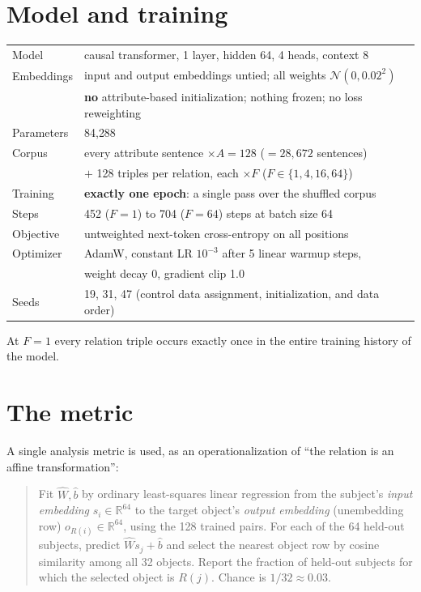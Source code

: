 \documentclass[11pt]{article}
\begin{document}
\section{Model and training}

\begin{center}
\begin{tabular}{ll}
\toprule
Model & causal transformer, 1 layer, hidden 64, 4 heads, context 8\\
Embeddings & input and output embeddings untied; all weights $\mathcal{N}(0, 0.02^2)$\\
 & \textbf{no} attribute-based initialization; nothing frozen; no loss reweighting\\
Parameters & 84{,}288\\
Corpus & every attribute sentence $\times A{=}128$ ($= 28{,}672$ sentences)\\
 & $+$ 128 triples per relation, each $\times F$ ($F \in \{1,4,16,64\}$)\\
Training & \textbf{exactly one epoch}: a single pass over the shuffled corpus\\
Steps & 452 ($F{=}1$) to 704 ($F{=}64$) steps at batch size 64\\
Objective & untweighted next-token cross-entropy on all positions\\
Optimizer & AdamW, constant LR $10^{-3}$ after 5 linear warmup steps,\\
 & weight decay 0, gradient clip 1.0\\
Seeds & 19, 31, 47 (control data assignment, initialization, and data order)\\
\bottomrule
\end{tabular}
\end{center}

At $F{=}1$ every relation triple occurs exactly once in the entire training history of the model.

\section{The metric}

A single analysis metric is used, as an operationalization of ``the relation is an affine transformation'':

\begin{quote}
Fit $\hat W, \hat b$ by ordinary least-squares linear regression from the subject's \emph{input embedding} $s_i \in \mathbb{R}^{64}$ to the target object's \emph{output embedding} (unembedding row) $o_{R(i)} \in \mathbb{R}^{64}$, using the 128 trained pairs. For each of the 64 held-out subjects, predict $\hat W s_j + \hat b$ and select the nearest object row by cosine similarity among all 32 objects. Report the fraction of held-out subjects for which the selected object is $R(j)$. Chance is $1/32 \approx 0.03$.
\end{quote}
\end{document}
